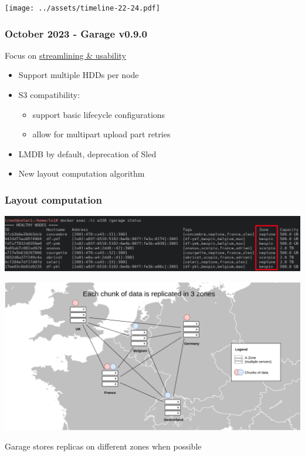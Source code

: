 \documentclass[aspectratio=169]{beamer}
\begin{document}

\begin{frame}
	\begin{center}
		\texttt{[image: ../assets/timeline-22-24.pdf]}
	\end{center}
\end{frame}

\begin{frame}
	\frametitle{October 2023 - Garage v0.9.0}
	Focus on \underline{streamlining \& usability}
	\vspace{2em}
	\begin{itemize}
		\item Support multiple HDDs per node
			\vspace{1em}
		\item S3 compatibility: 
			\vspace{1em}
			\begin{itemize}
				\item support basic lifecycle configurations
					\vspace{.5em}
				\item allow for multipart upload part retries
			\end{itemize}
			\vspace{1em}
		\item LMDB by default, deprecation of Sled
			\vspace{1em}
		\item New layout computation algorithm
	\end{itemize}
\end{frame}


\begin{frame}
	\frametitle{Layout computation}
	\begin{overprint}
		\begin{center}
			\includegraphics[width=\linewidth, trim=0 0 0 -4cm]{../assets/screenshots/garage_status_0.9_prod_zonehl.png}
		\end{center}
		\begin{center}
			\includegraphics[width=.7\linewidth]{../assets/map.png}
		\end{center}
	\end{overprint}
	\vspace{1em}
	Garage stores replicas on different zones when possible
\end{frame}
\end{document}
